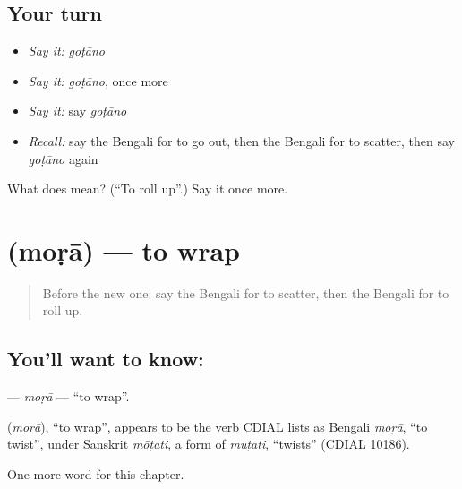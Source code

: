 \subsection*{Your turn}
\begin{itemize}
\raggedright
  \item \emph{Say it:} \emph{goṭāno}
  \item \emph{Say it:} \emph{goṭāno}, once more
  \item \emph{Say it:} say \emph{goṭāno}
  \item \emph{Recall:} say the Bengali for to go out, then the Bengali for to scatter, then say \emph{goṭāno} again
\end{itemize}

\begin{tcolorbox}[breakable,colback=teal!4,colframe=teal!35!black,title={Before you move on}]
What does  mean? (\textquotedblleft{}To roll up\textquotedblright{}.) Say it once more.
\end{tcolorbox}
\section[\texorpdfstring{\bn{মোড়া} (moṛā)}{মোড়া (moṛā)}]{ (moṛā) — to wrap}

\label{lesson:BN-C242-mora2}



\begin{quote}
Before the new one: say the Bengali for to scatter, then the Bengali for to roll up.
\end{quote}

\subsection*{You'll want to know: }
\textbf{} — \emph{moṛā} — \textquotedblleft{}to wrap\textquotedblright{}.

\begin{cousinweb}
\textbf{} (\emph{moṛā}), \textquotedblleft{}to wrap\textquotedblright{}, appears to be the verb CDIAL lists as Bengali \emph{moṛā}, \textquotedblleft{}to twist\textquotedblright{}, under Sanskrit \emph{mōṭati}, a form of \emph{muṭati}, \textquotedblleft{}twists\textquotedblright{} (CDIAL 10186).
\end{cousinweb}

\begin{grammarlens}[title={What you've built}]
One more word for this chapter.
\end{grammarlens}

